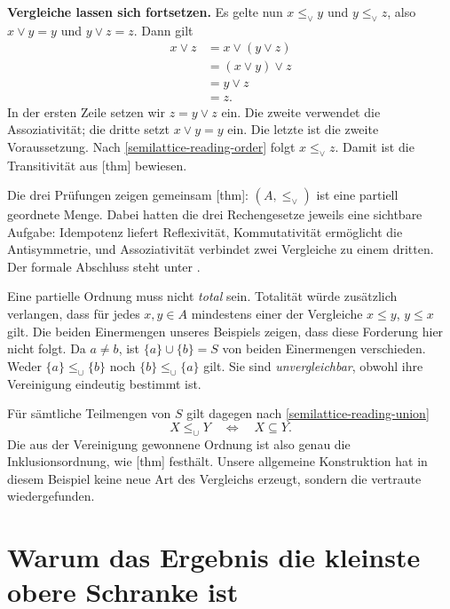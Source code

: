 \medskip\noindent\textbf{Vergleiche lassen sich fortsetzen.}
Es gelte nun \(x\leq_\vee y\) und \(y\leq_\vee z\),
also \(x\vee y=y\) und \(y\vee z=z\). Dann gilt
\[
  \begin{aligned}
    x\vee z
      &=x\vee(y\vee z)\\
      &=(x\vee y)\vee z\\
      &=y\vee z\\
      &=z.
  \end{aligned}
\]
In der ersten Zeile setzen wir \(z=y\vee z\) ein. Die zweite
verwendet die Assoziativität; die dritte setzt \(x\vee y=y\)
ein. Die letzte ist die zweite Voraussetzung. Nach
\eqref{semilattice-reading-order} folgt \(x\leq_\vee z\).
Damit ist die Transitivität aus
[thm] bewiesen.

Die drei Prüfungen zeigen gemeinsam
[thm]:
\((A,\leq_\vee)\) ist eine partiell geordnete Menge.
Dabei hatten die drei Rechengesetze jeweils eine sichtbare Aufgabe:
Idempotenz liefert Reflexivität, Kommutativität ermöglicht die
Antisymmetrie, und Assoziativität verbindet zwei Vergleiche zu
einem dritten. Der formale Abschluss steht unter
.

Eine partielle Ordnung muss nicht \emph{total} sein. Totalität
würde zusätzlich verlangen, dass für jedes \(x,y\in A\)
mindestens einer der Vergleiche \(x\leq y\), \(y\leq x\)
gilt. Die beiden Einermengen unseres Beispiels zeigen, dass diese
Forderung hier nicht folgt. Da \(a\neq b\), ist
\(\{a\}\cup\{b\}=S\) von beiden Einermengen verschieden.
Weder \(\{a\}\leq_\cup\{b\}\) noch
\(\{b\}\leq_\cup\{a\}\) gilt. Sie sind
\emph{unvergleichbar}, obwohl ihre Vereinigung eindeutig bestimmt ist.

Für sämtliche Teilmengen von \(S\) gilt dagegen nach
\eqref{semilattice-reading-union}
\[
  X\leq_\cup Y\quad\Longleftrightarrow\quad X\subseteq Y.
\]
Die aus der Vereinigung gewonnene Ordnung ist also genau die
Inklusionsordnung, wie
[thm] festhält.
Unsere allgemeine Konstruktion hat in diesem Beispiel keine neue
Art des Vergleichs erzeugt, sondern die vertraute wiedergefunden.

\par{}
\section*{Warum das Ergebnis die kleinste obere Schranke ist}
\hypertarget{semilattice.reading.supremum}{}

